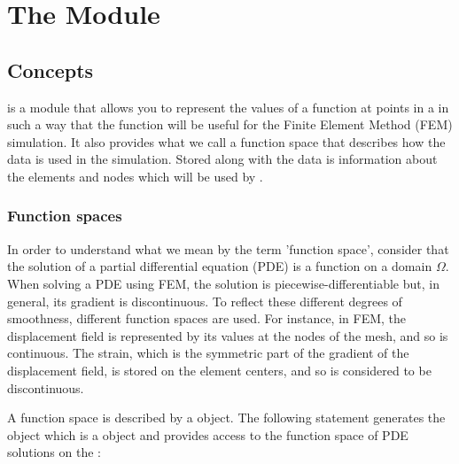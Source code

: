 
%
%
%

\chapter{The \escript Module}\label{ESCRIPT CHAP}

\section{Concepts}
\escript is a \PYTHON module that allows you to represent the values of
a function at points in a \Domain in such a way that the function will
be useful for the Finite Element Method (FEM) simulation. It also
provides what we call a function space that describes how the data is
used in the simulation. Stored along with the data is information
about the elements and nodes which will be used by \finley.

\subsection{Function spaces}
In order to understand what we mean by the term 'function space',
consider that the solution of a partial differential
equation (PDE) is a function on a domain
$\Omega$.  When solving a PDE using FEM, the solution is
piecewise-differentiable but, in general, its gradient is discontinuous.
To reflect these different degrees of smoothness, different function spaces
are used.
For instance, in FEM, the displacement field is represented by its values at
the nodes of the mesh, and so is continuous.
The strain, which is the symmetric part of the gradient of the displacement
field, is stored on the element centers, and so is considered to be
discontinuous.

A function space is described by a \FunctionSpace object.
The following statement generates the object  which is
a \FunctionSpace object and provides access to the function space of
PDE solutions on the \Domain {}:

